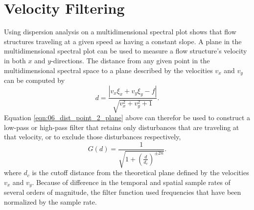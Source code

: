 \section{Velocity Filtering}
Using dispersion analysis on a multidimensional spectral plot shows that flow structures traveling at a given speed as having a constant slope.
A plane in the multidimensional spectral plot can be used to measure a flow structure's velocity in both $x$ and $y$-directions.
The distance from any given point in the multidimensional spectral space to a plane described by the velocities $v_x$ and $v_y$ can be computed by
\begin{equation}
 d = \frac{|v_x\xi_x+v_y\xi_y-f|}{\sqrt{v_x^2+v_y^2+1}} \textrm{.}
 \label{eqn:06_dist_point_2_plane}
\end{equation}
Equation \ref{eqn:06_dist_point_2_plane} above can therefor be used to construct a low-pass or high-pass filter that retains only disturbances that are traveling at that velocity, or to exclude those disturbances respectively,
\begin{equation}
  G(d) = \frac{1}{\sqrt{1+\left(\frac{d}{d_c}\right)^{\pm2n}}} \textrm{.}
  \label{eqn:06_butterworth_velocity}
\end{equation}
where $d_c$ is the cutoff distance from the theoretical plane defined by the velocities $v_x$ and $v_y$.
Because of difference in the temporal and spatial sample rates of several orders of magnitude, the filter function used frequencies that have been normalized by the sample rate.


